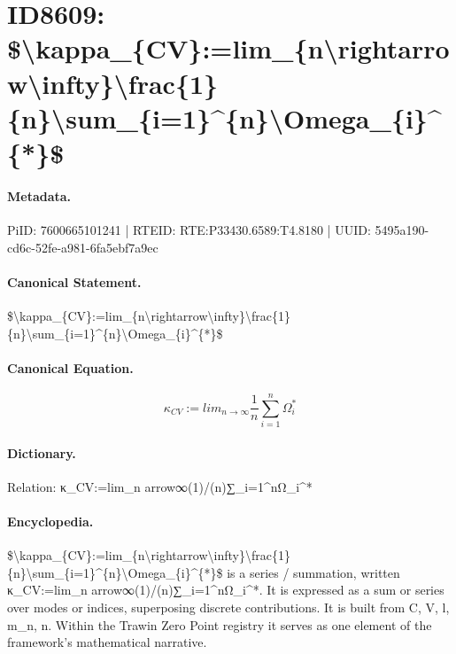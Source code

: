 \section*{ID8609: \$\textbackslash{}kappa\_\{CV\}:=lim\_\{n\textbackslash{}rightarrow\textbackslash{}infty\}\textbackslash{}frac\{1\}\{n\}\textbackslash{}sum\_\{i=1\}\textasciicircum{}\{n\}\textbackslash{}Omega\_\{i\}\textasciicircum{}\{*\}\$}
\paragraph{Metadata.}
PiID: 7600665101241 | RTEID: RTE:P33430.6589:T4.8180 | UUID: 5495a190-cd6c-52fe-a981-6fa5ebf7a9ec

\paragraph{Canonical Statement.}
\$\textbackslash{}kappa\_\{CV\}:=lim\_\{n\textbackslash{}rightarrow\textbackslash{}infty\}\textbackslash{}frac\{1\}\{n\}\textbackslash{}sum\_\{i=1\}\textasciicircum{}\{n\}\textbackslash{}Omega\_\{i\}\textasciicircum{}\{*\}\$

\paragraph{Canonical Equation.}
\[
\kappa_{CV}:=lim_{n\rightarrow\infty}\frac{1}{n}\sum_{i=1}^{n}\Omega_{i}^{*}
\]

\paragraph{Dictionary.}
Relation: κ\_CV:=lim\_n arrow∞(1)/(n)∑\_i=1\textasciicircum{}nΩ\_i\textasciicircum{}*

\paragraph{Encyclopedia.}
\$\textbackslash{}kappa\_\{CV\}:=lim\_\{n\textbackslash{}rightarrow\textbackslash{}infty\}\textbackslash{}frac\{1\}\{n\}\textbackslash{}sum\_\{i=1\}\textasciicircum{}\{n\}\textbackslash{}Omega\_\{i\}\textasciicircum{}\{*\}\$ is a series / summation, written κ\_CV:=lim\_n arrow∞(1)/(n)∑\_i=1\textasciicircum{}nΩ\_i\textasciicircum{}*. It is expressed as a sum or series over modes or indices, superposing discrete contributions. It is built from C, V, l, m\_n, n. Within the Trawin Zero Point registry it serves as one element of the framework's mathematical narrative.
